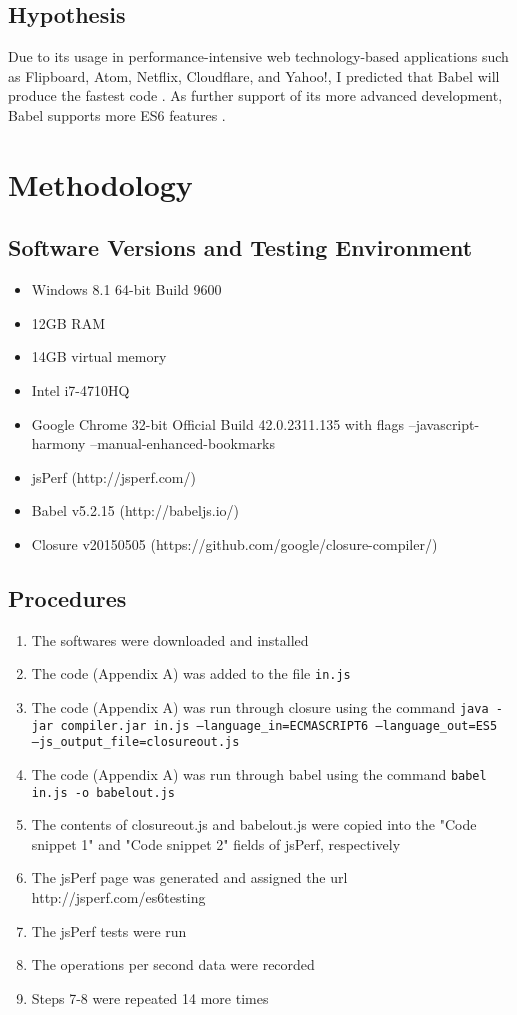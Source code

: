 \documentclass[12pt]{article}
\begin{document}
\subsection{Hypothesis}
Due to its usage in performance-intensive web technology-based applications such as Flipboard, Atom, Netflix, Cloudflare, and Yahoo!, I predicted that Babel will produce the fastest code \cite{babel}. As further support of its more advanced development, Babel supports more ES6 features \cite{compat}.
\section{Methodology}
\subsection{Software Versions and Testing Environment}
\begin{itemize}
\item Windows 8.1 64-bit Build 9600
\item 12GB RAM
\item 14GB virtual memory
\item Intel i7-4710HQ
\item Google Chrome 32-bit Official Build 42.0.2311.135 with flags --javascript-harmony --manual-enhanced-bookmarks
\item jsPerf (http://jsperf.com/)
\item Babel v5.2.15 (http://babeljs.io/)
\item Closure v20150505 (https://github.com/google/closure-compiler/)
\end{itemize}


\subsection{Procedures}
\begin{enumerate}
\item The softwares were downloaded and installed
\item The code (Appendix A) was added to the file \texttt{in.js}
\item The code (Appendix A) was run through closure using the command \texttt{java -jar compiler.jar in.js --language\_in=ECMASCRIPT6 --language\_out=ES5 \\
--js\_output\_file=closureout.js}
\item The code (Appendix A) was run through babel using the command \texttt{babel in.js -o babelout.js}
\item The contents of closureout.js and babelout.js were copied into the "Code snippet 1" and "Code snippet 2" fields of jsPerf, respectively
\item The jsPerf page was generated and assigned the url http://jsperf.com/es6testing
\item The jsPerf tests were run
\item The operations per second data were recorded
\item Steps 7-8 were repeated 14 more times
\end{enumerate}
\end{document}
